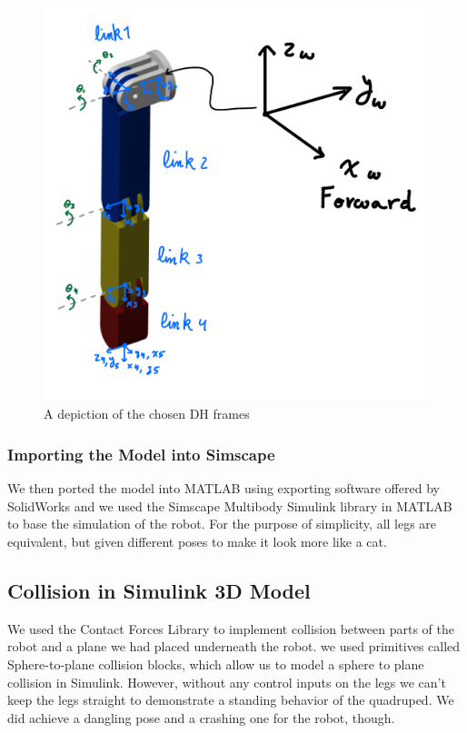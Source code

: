 \begin{figure}[thpb]
    \parbox{\linewidth}{\includegraphics[width=\linewidth]{Figures/dhframes.png}}
    \caption{A depiction of the chosen DH frames}
    \label{fig:dhframes}
\end{figure}

\subsubsection*{Importing the Model into Simscape}
We then ported the model into MATLAB using exporting software offered by SolidWorks and we used the Simscape Multibody Simulink library in MATLAB to base the simulation of the robot. For the purpose of simplicity, all legs are equivalent, but given different poses to make it look more like a cat.

\subsection{Collision in Simulink 3D Model}
We used the Contact Forces Library to implement collision between parts of the robot and a plane we had placed underneath the robot. we used primitives called Sphere-to-plane collision blocks, which allow us to model a sphere to plane collision in Simulink. However, without any control inputs on the legs we can't keep the legs straight to demonstrate a standing behavior of the quadruped. We did achieve a dangling pose and a crashing one for the robot, though.

